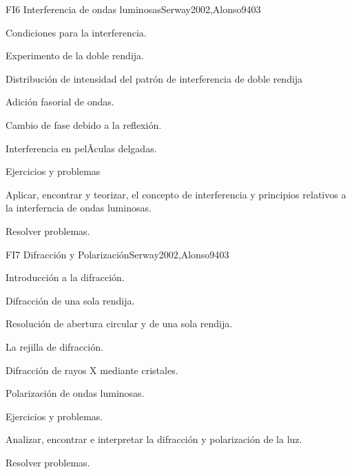 \begin{syllabus}
\begin{unit}{FI6 Interferencia de ondas luminosas}{Serway2002,Alonso94}{0}{3}
\begin{topics}
      \item Condiciones para la interferencia.
        \item Experimento de la doble rendija.
        \item Distribución de intensidad del patrón
              de interferencia de doble rendija
        \item Adición fasorial de ondas.
        \item Cambio de fase debido a la reflexión.
        \item Interferencia en pelÃ­culas delgadas.
        \item Ejercicios y problemas
   \end{topics}
   \begin{unitgoals}
      \item Aplicar, encontrar y teorizar, el concepto de interferencia y
            principios relativos a la interferncia de ondas luminosas.
      \item Resolver problemas.
   \end{unitgoals}
\end{unit}

\begin{unit}{FI7 Difracción y Polarización}{Serway2002,Alonso94}{0}{3}
\begin{topics}
      \item Introducción a la difracción.
      \item Difracción de una sola rendija.
      \item Resolución de abertura circular y de una sola rendija.
      \item La rejilla de difracción.
      \item Difracción de rayos X mediante cristales.
      \item Polarización de ondas luminosas.
      \item Ejercicios y problemas.
   \end{topics}

   \begin{unitgoals}
      \item Analizar, encontrar e interpretar la difracción y polarización de la luz.
      \item Resolver problemas.
   \end{unitgoals}
\end{unit}



\begin{coursebibliography}
\end{coursebibliography}

\end{syllabus}
